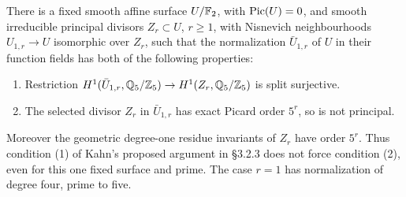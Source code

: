 \begin{proposition}
\label{prop:B-Kahn-principalization}
There is a fixed smooth affine surface \(U/\mathbb F_2\), with
\(\operatorname{Pic}(U)=0\), and smooth irreducible principal divisors
\(Z_r\subset U\), \(r\geq1\), with Nisnevich neighbourhoods
\(U_{1,r}\to U\) isomorphic over \(Z_r\), such that the
normalization \(\bar U_{1,r}\) of \(U\) in their function fields
has both of the following properties:
\begin{enumerate}
\item Restriction
\(H^1(\bar U_{1,r},\mathbb Q_5/\mathbb Z_5)\to
H^1(Z_r,\mathbb Q_5/\mathbb Z_5)\) is split surjective.
\item The selected divisor \(Z_r\) in \(\bar U_{1,r}\)
has exact Picard order \(5^r\), so is not principal.
\end{enumerate}
Moreover the geometric degree-one residue invariants of \(Z_r\)
have order \(5^r\).  Thus condition (1) of
Kahn's proposed argument in \S3.2.3 does not force condition (2),
even for this one fixed surface and prime.  The case \(r=1\)
has normalization of degree four, prime to five.
\end{proposition}
